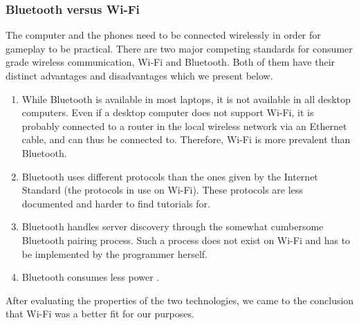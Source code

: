 \documentclass{article}
\begin{document}
\subsubsection{Bluetooth versus Wi-Fi}
The computer and the phones need to be connected wirelessly in order for gameplay to be
practical. There are two major competing standards for consumer grade wireless communication,
Wi-Fi and Bluetooth. Both of them have their distinct advantages and disadvantages which we
present below.
\begin{enumerate}
\item  While Bluetooth is available in most laptops, it is not available in all desktop computers.
Even if a desktop computer does not support Wi-Fi, it is probably connected to a router in
the local wireless network via an Ethernet cable, and can thus be connected to. Therefore,
Wi-Fi is more prevalent than Bluetooth.

\item Bluetooth uses different protocols than the ones given by the Internet Standard (the
protocols in use on Wi-Fi). These protocols are less documented and harder to find
tutorials for.

\item Bluetooth handles server discovery through the somewhat cumbersome Bluetooth pairing
process. Such a process does not exist on Wi-Fi and has to be implemented by the
programmer herself.

\item Bluetooth consumes less power \cite{key:9}.
\end{enumerate}
After evaluating the properties of the two technologies, we came to the conclusion that Wi-Fi
was a better fit for our purposes.
\end{document}
